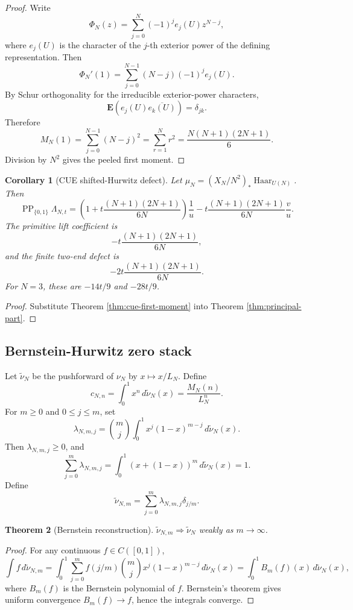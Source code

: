 \documentclass[11pt]{article}
\newcommand{\PP}{\operatorname{PP}}
\newcommand{\Haar}{\operatorname{Haar}}
\newcommand{\wt}{\widetilde}
\theoremstyle{plain}
\newtheorem{theorem}{Theorem}[section]
\newtheorem{corollary}[theorem]{Corollary}
\theoremstyle{definition}
\numberwithin{equation}{section}
\begin{document}
\begin{proof}
Write
\[
 \Phi_N(z)=\sum_{j=0}^N(-1)^j e_j(U)z^{N-j},
\]
where \(e_j(U)\) is the character of the \(j\)-th exterior power of the defining representation.  Then
\[
 \Phi_N'(1)=\sum_{j=0}^{N-1}(N-j)(-1)^j e_j(U).
\]
By Schur orthogonality for the irreducible exterior-power characters,
\[
 \mathbf E(e_j(U)\overline{e_k(U)})=\delta_{jk}.
\]
Therefore
\[
 M_N(1)=\sum_{j=0}^{N-1}(N-j)^2=\sum_{r=1}^N r^2=\frac{N(N+1)(2N+1)}6.
\]
Division by \(N^2\) gives the peeled first moment.
\end{proof}

\begin{corollary}[CUE shifted-Hurwitz defect]\label{cor:cue-defect}
Let \(\mu_N=(X_N/N^2)_*\Haar_{U(N)}\).  Then
\[
 \PP_{\{0,1\}}\Lambda_{N,t}=\left(1+t\frac{(N+1)(2N+1)}{6N}\right)\frac1u
 -t\frac{(N+1)(2N+1)}{6N}\frac vu.
\]
The primitive lift coefficient is
\[
 -t\frac{(N+1)(2N+1)}{6N},
\]
and the finite two-end defect is
\[
 -2t\frac{(N+1)(2N+1)}{6N}.
\]
For \(N=3\), these are \(-14t/9\) and \(-28t/9\).
\end{corollary}

\begin{proof}
Substitute Theorem \ref{thm:cue-first-moment} into Theorem \ref{thm:principal-part}.
\end{proof}

\subsection{Bernstein-Hurwitz zero stack}

Let \(\wt\nu_N\) be the pushforward of \(\nu_N\) by \(x\mapsto x/L_N\).  Define
\[
 c_{N,n}=\int_0^1x^n\,d\wt\nu_N(x)=\frac{M_N(n)}{L_N^n}.
\]
For \(m\ge0\) and \(0\le j\le m\), set
\[
 \lambda_{N,m,j}=\binom mj\int_0^1x^j(1-x)^{m-j}\,d\wt\nu_N(x).
\]
Then \(\lambda_{N,m,j}\ge0\), and
\[
 \sum_{j=0}^m\lambda_{N,m,j}=\int_0^1(x+(1-x))^m\,d\wt\nu_N(x)=1.
\]
Define
\[
 \wt\nu_{N,m}=\sum_{j=0}^m\lambda_{N,m,j}\delta_{j/m}.
\]

\begin{theorem}[Bernstein reconstruction]
\(\wt\nu_{N,m}\Rightarrow\wt\nu_N\) weakly as \(m\to\infty\).
\end{theorem}

\begin{proof}
For any continuous \(f\in C([0,1])\),
\[
 \int f\,d\wt\nu_{N,m}=\int_0^1\sum_{j=0}^m f(j/m)\binom mjx^j(1-x)^{m-j}\,d\wt\nu_N(x)
 =\int_0^1 B_m(f)(x)\,d\wt\nu_N(x),
\]
where \(B_m(f)\) is the Bernstein polynomial of \(f\).  Bernstein's theorem gives uniform convergence \(B_m(f)\to f\), hence the integrals converge.
\end{proof}
\end{document}

